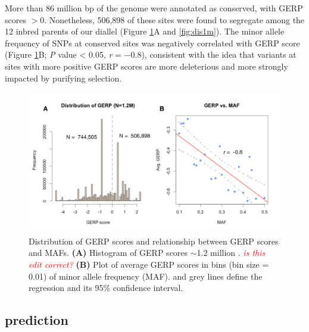 \documentclass[9pt,twocolumn,twoside]{gsajnl}
\newcommand{\jri}[1]{\textcolor{red}{ \emph{ #1}} }
\begin{document}
More than 86 million bp of the genome were annotated as conserved, with GERP scores $>0$.
Nonetheless, 506,898 of these sites were found to segregate among the 12 inbred parents of our diallel (Figure \ref{fig:gerpmaf}A and \ref{fig:dis1m}).
The minor allele frequency of SNPs at conserved sites was negatively correlated with GERP score (Figure \ref{fig:gerpmaf}B; \emph{P} value < 0.05, \emph{r} = $-0.8$), consistent with the idea that variants at sites with more positive GERP scores are more deleterious and more strongly impacted by purifying selection.

\begin{figure}[htbp]
\centering
\includegraphics[width=\linewidth]{Figure_gerpmaf.pdf}
\caption{Distribution of GERP scores and relationship between GERP scores and MAFs. \textbf{(A)} Histogram of GERP scores \DIFdelbeginFL {}\DIFdelendFL \DIFaddbeginFL {}\DIFaddendFL $\sim$1.2 million \DIFdelbeginFL {}\DIFdelendFL \DIFaddbeginFL {}\DIFaddendFL . \DIFdelbeginFL \DIFdelendFL \DIFaddbeginFL \jri{is this edit correct?} \DIFaddendFL \textbf{(B)} Plot of average GERP scores in bins (bin size = 0.01) of minor allele frequency (MAF). \DIFdelbeginFL {}\DIFdelendFL \DIFaddbeginFL {}\DIFaddendFL and grey lines define the regression and its 95\% confidence interval.}
\label{fig:gerpmaf}
\end{figure}


\subsection*{\DIFdelbegin {}\DIFdelend \DIFaddbegin {}\DIFaddend prediction\DIFdelbegin {}\DIFdelend }
\end{document}
